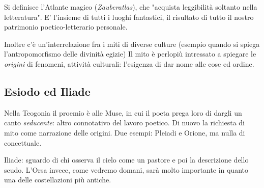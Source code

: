 \documentclass[main.tex]{subfiles}
\begin{document}
Si definisce l'Atlante magico (\textit{Zauberatlas}), che "acquista leggibilità soltanto nella letteratura". E' l'insieme di tutti i luoghi fantastici, il risultato di tutto il nostro patrimonio poetico-letterario personale.

Inoltre c'è un'interrelazione fra i miti di diverse culture (esempio quando si spiega l'antropomorfismo delle divinità egizie)
Il mito è perlopiù intressato a spiegare le \textit{origini} di fenomeni, attività culturali: l'esigenza di dar nome alle cose ed ordine.

\subsection{Esiodo ed Iliade}
Nella Teogonia il proemio è alle Muse, in cui il poeta prega loro di dargli un canto \textit{seducente}: altro connotativo del lavoro poetico.
Di nuovo la richiesta di mito come narrazione delle origini.
Due esempi: Pleiadi e Orione, ma nulla di concettuale.

Iliade: sguardo di chi osserva il cielo come un pastore e poi la descrizione dello scudo. L'Orsa invece, come vedremo domani, sarà molto importante in quanto una delle costellazioni più antiche.
\end{document}
